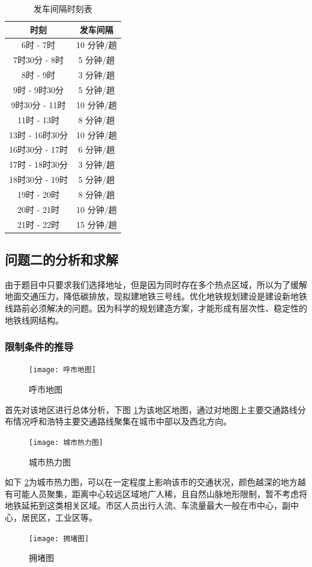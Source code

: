 \documentclass[12pt,a4paper]{mcmthesis}
\begin{document}
        \begin{table}[h]
            \centering
            \caption{发车间隔时刻表}
            \label{tab:p1_interval}
            \begin{tabular}{c|c}
                \hline
                时刻           & 发车间隔 \\ \hline
                6时 - 7时      & 10 分钟/趟 \\
                7时30分 - 8时  & 5 分钟/趟 \\
                8时 - 9时      & 3 分钟/趟 \\
                9时 - 9时30分  & 5 分钟/趟 \\
                9时30分 - 11时 & 10 分钟/趟 \\
                11时 - 13时    & 8 分钟/趟 \\
                13时 - 16时30分 & 10 分钟/趟 \\
                16时30分 - 17时 & 6 分钟/趟 \\
                17时 - 18时30分 & 3 分钟/趟 \\
                18时30分 - 19时 & 5 分钟/趟 \\
                19时 - 20时    & 8 分钟/趟 \\
                20时 - 21时    & 10 分钟/趟 \\
                21时 - 22时    & 15 分钟/趟 \\
            \end{tabular}
        \end{table}

\subsection{问题二的分析和求解}
由于题目中只要求我们选择地址，但是因为同时存在多个热点区域，所以为了缓解地面交通压力，降低碳排放，现拟建地铁三号线。优化地铁规划建设是建设新地铁线路前必须解决的问题。因为科学的规划建造方案，才能形成有层次性、稳定性的地铁线网结构。
\subsubsection{限制条件的推导}
\begin{figure}[h!t]
	\centerline{\texttt{[image: 呼市地图]}\quad
	}
	\caption{\song\wuhao
		呼市地图}
	\label{fig:呼市地图}
\end{figure}
首先对该地区进行总体分析，下图 \ref{fig:呼市地图}为该地区地图，通过对地图上主要交通路线分布情况呼和浩特主要交通路线聚集在城市中部以及西北方向。
\begin{figure}[h!t]
	\centerline{\texttt{[image: 城市热力图]}\quad
	}
	\caption{\song\wuhao
		城市热力图}
	\label{fig:城市热力图}
\end{figure}
如下 \ref{fig:城市热力图}为城市热力图，可以在一定程度上影响该市的交通状况，颜色越深的地方越有可能人员聚集，距离中心较远区域地广人稀，且自然山脉地形限制，暂不考虑将地铁延拓到这类相关区域。市区人员出行人流、车流量最大一般在市中心，副中心，居民区，工业区等。
\begin{figure}[h!t]
	\centerline{\texttt{[image: 拥堵图]}\quad
	}
	\caption{\song\wuhao
		拥堵图}
	\label{fig:拥堵图}
\end{figure}
\end{document}
